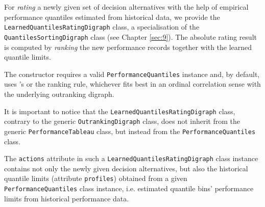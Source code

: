 For \emph{rating} a newly given set of decision alternatives with the help of empirical performance quantiles estimated from historical data, we provide the \texttt{Learned\-QuantilesRatingDigraph} class, a specialisation of the \texttt{QuantilesSor\-tingDigraph} class (see Chapter \ref{sec:9}). The absolute rating result is computed by \emph{ranking} the new performance records together with the learned quantile limits.

The constructor requires a valid \texttt{PerformanceQuantiles} instance and, by default, uses \Copeland 's or the \NetFlows ranking rule, whichever fits best in an ordinal correlation sense with the underlying outranking digraph.

It is important to notice that the \texttt{LearnedQuantilesRatingDigraph} class, contrary to the generic \texttt{OutrankingDigraph} class, does not inherit from the generic \texttt{PerformanceTableau} class, but instead from the \texttt{Performance\-Quantiles} class.

The \texttt{actions} attribute in such a \texttt{LearnedQuantilesRatingDigraph} class instance contains not only the newly given decision alternatives, but also the historical quantile limits (attribute \texttt{profiles}) obtained from a given \texttt{Perfor\-manceQuantiles} class instance, i.e. estimated quantile bins' performance limits from historical performance data.

